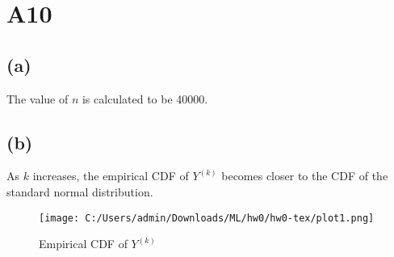 \documentclass{article}
\begin{document}
\section*{A10}

\subsection*{(a)}
The value of \( n \) is calculated to be 40000.

\subsection*{(b)}
As \( k \) increases, the empirical CDF of \( Y^{(k)} \) becomes closer to the CDF of the standard normal distribution.

\begin{figure}
    \centering
    \texttt{[image: C:/Users/admin/Downloads/ML/hw0/hw0-tex/plot1.png]}
    \caption{Empirical CDF of \( Y^{(k)} \)}
    \label{fig:empirical-cdf}
\end{figure}
\end{document}
